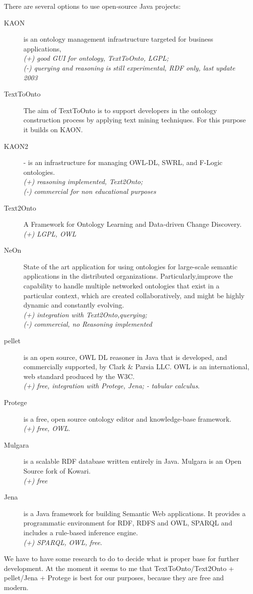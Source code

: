 \documentclass[12pt]{article}
\begin{document}
There are several options to use open-source Java projects:
\begin{description}
  \item[KAON] is an ontology management infrastructure targeted for business applications,\\
    \emph{(+) good GUI for ontology, TextToOnto, LGPL;}\\
    \emph{(-) querying and reasoning is still experimental, RDF only, last update 2003}
  \item[TextToOnto] The aim of TextToOnto is to support developers in the ontology construction process by applying text mining techniques. For this purpose it builds on KAON.
  \item[KAON2] - is an infrastructure for managing OWL-DL, SWRL, and F-Logic ontologies.\\
    \emph{(+) reasoning implemented, Text2Onto;}\\ 
    \emph{(-) commercial for non educational purposes}
  \item[Text2Onto] A Framework for Ontology Learning and Data-driven Change Discovery.\\
    \emph{(+) LGPL, OWL}
  \item[NeOn] State of the art application for using ontologies for large-scale semantic applications in the distributed organizations. Particularly,improve the capability to handle multiple networked ontologies that exist in a particular context, which are created collaboratively, and might be highly dynamic and constantly evolving.\\
    \emph{(+) integration with Text2Onto,querying;}\\ 
    \emph{(-) commercial, no Reasoning implemented}
  \item[pellet] is an open source, OWL DL reasoner in Java that is developed, and commercially supported, by Clark \& Parsia LLC. OWL is an international, web standard produced by the W3C.\\
    \emph{(+) free, integration with Protege, Jena; - tabular calculus}.
  \item[Protege] is a free, open source ontology editor and knowledge-base framework.\\
    \emph{(+) free, OWL}.
  \item[Mulgara] is a scalable RDF database written entirely in Java. Mulgara is an Open Source fork of Kowari.\\
    \emph{(+) free}
  \item[Jena] is a Java framework for building Semantic Web applications. It provides a programmatic environment for RDF, RDFS and OWL, SPARQL and includes a rule-based inference engine.\\
    \emph{(+) SPARQL, OWL, free}.
\end{description}
We have to have some research to do to decide what is proper base for further development. At the moment it seems to me that TextToOnto/Text2Onto + pellet/Jena + Protege is best for our purposes, because they are free and modern.
\end{document}
